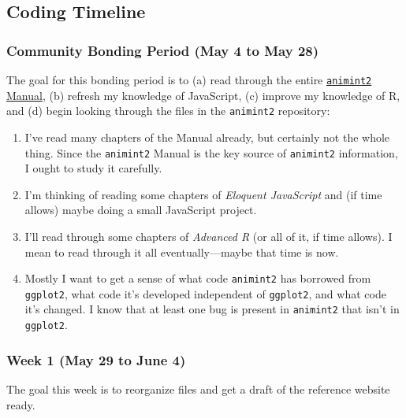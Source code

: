 \documentclass[
]{article}
\providecommand{\tightlist}{%
  \setlength{\itemsep}{0pt}\setlength{\parskip}{0pt}}\usepackage{longtable,booktabs,array}
\begin{document}
\pagebreak

\hypertarget{coding-timeline}{%
\subsection{Coding Timeline}\label{coding-timeline}}

\hypertarget{community-bonding-period-may-4-to-may-28}{%
\subsubsection{Community Bonding Period (May 4 to May
28)}\label{community-bonding-period-may-4-to-may-28}}

The goal for this bonding period is to (a) read through the entire
\href{https://rcdata.nau.edu/genomic-ml/animint2-manual/Ch00-preface.html}{\texttt{animint2}
Manual}, (b) refresh my knowledge of JavaScript, (c) improve my
knowledge of R, and (d) begin looking through the files in the
\texttt{animint2} repository:

\begin{enumerate}
\def\labelenumi{\alph{enumi}.}
\tightlist
\item
  I've read many chapters of the Manual already, but certainly not the
  whole thing. Since the \texttt{animint2} Manual is the key source of
  \texttt{animint2} information, I ought to study it carefully.
\item
  I'm thinking of reading some chapters of \emph{Eloquent JavaScript}
  and (if time allows) maybe doing a small JavaScript project.
\item
  I'll read through some chapters of \emph{Advanced R} (or all of it, if
  time allows). I mean to read through it all eventually---maybe that
  time is now.
\item
  Mostly I want to get a sense of what code \texttt{animint2} has
  borrowed from \texttt{ggplot2}, what code it's developed independent
  of \texttt{ggplot2}, and what code it's changed. I know that at least
  one bug is present in \texttt{animint2} that isn't in
  \texttt{ggplot2}.
\end{enumerate}

\hypertarget{week-1-may-29-to-june-4}{%
\subsubsection{Week 1 (May 29 to June
4)}\label{week-1-may-29-to-june-4}}

The goal this week is to reorganize files and get a draft of the
reference website ready.
\end{document}
